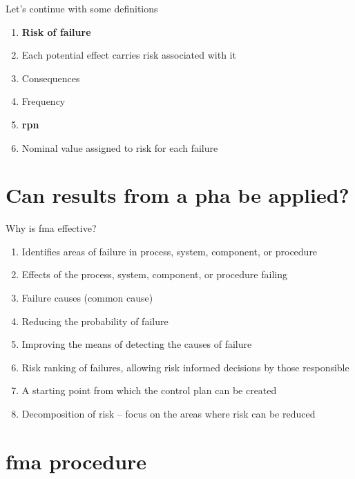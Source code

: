 \documentclass[aspectratio=1610,pdftex,dvipsnames,compress,xcolor={dvipsnames}]{beamer}
\newcommand{\acl}{\acrlong} %
\newcommand{\acs}{\acrshort} %
\begin{document}
\begin{frame}{Let's continue with some definitions}
    \begin{enumerate}[series=outerlist,topsep=0pt,itemsep=1pt,leftmargin=*,label=(\arabic*)]
        \item[]\textbf{Risk of failure}
        \item[]Each potential effect carries risk associated with it
        \item[]Consequences
        \item[]Frequency
            \vspace{0.25in}
        \item[]\textbf{\acl{rpn}}
        \item[]Nominal value assigned to risk for each failure
    \end{enumerate}
\end{frame}


\section{Can results from a \acs{pha} be applied?}


\addtocounter{framenumber}{-1}
\begin{frame}{Why is \acs{fma} effective?}
    \begin{enumerate}[series=outerlist,topsep=0pt,itemsep=11pt,leftmargin=*,label=(\arabic*)]
        \item[]Identifies areas of failure in process, system, component, or procedure
        \item[]Effects of the process, system, component, or procedure failing
        \item[]Failure causes (common cause)
        \item[]Reducing the probability of failure  
        \item[]Improving the means of detecting the causes of failure  
        \item[]Risk ranking of failures, allowing risk informed decisions by those responsible 
        \item[]A starting point from which the control plan can be created
        \item[]Decomposition of risk -- focus on the areas where risk can be reduced
    \end{enumerate}
\end{frame}


\section{\acs{fma} procedure}
\end{document}
